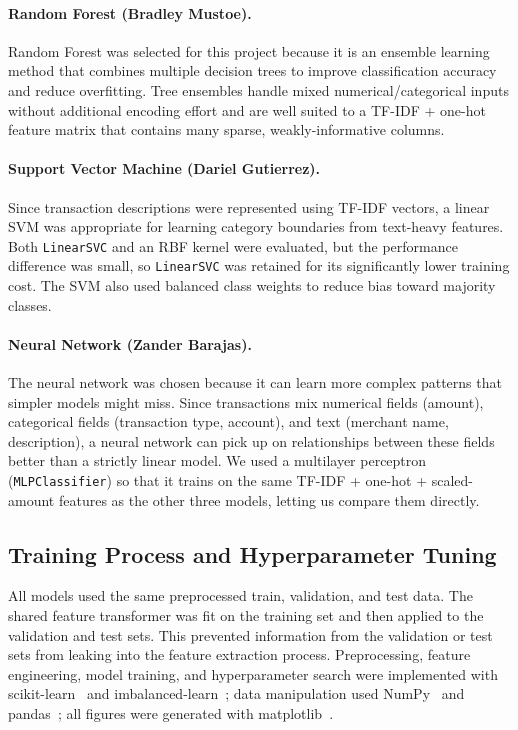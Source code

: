 \documentclass[11pt]{article}
\begin{document}
\paragraph{Random Forest (Bradley Mustoe).}
Random Forest was selected for this project because it is an ensemble
learning method that combines multiple decision trees to improve
classification accuracy and reduce overfitting. Tree ensembles handle
mixed numerical/categorical inputs without additional encoding effort and
are well suited to a TF-IDF + one-hot feature matrix that contains many
sparse, weakly-informative columns.

\paragraph{Support Vector Machine (Dariel Gutierrez).}
Since transaction descriptions were represented using TF-IDF vectors, a
linear SVM was appropriate for learning category boundaries from text-heavy
features. Both \texttt{LinearSVC} and an RBF kernel were evaluated, but the
performance difference was small, so \texttt{LinearSVC} was retained for its
significantly lower training cost. The SVM also used balanced class weights
to reduce bias toward majority classes.

\paragraph{Neural Network (Zander Barajas).}
The neural network was chosen because it can learn more complex patterns
that simpler models might miss. Since transactions mix numerical fields
(amount), categorical fields (transaction type, account), and text
(merchant name, description), a neural network can pick up on
relationships between these fields better than a strictly linear model.
We used a multilayer perceptron (\texttt{MLPClassifier}) so that it
trains on the same TF-IDF + one-hot + scaled-amount features as the
other three models, letting us compare them directly.

\subsection{Training Process and Hyperparameter Tuning}

All models used the same preprocessed train, validation, and test data. The
shared feature transformer was fit on the training set and then applied to
the validation and test sets. This prevented information from the validation
or test sets from leaking into the feature extraction process. Preprocessing,
feature engineering, model training, and hyperparameter search were
implemented with scikit-learn~\cite{sklearn} and imbalanced-learn~\cite{imblearn};
data manipulation used NumPy~\cite{numpy} and pandas~\cite{pandas}; all
figures were generated with matplotlib~\cite{matplotlib}.
\end{document}
